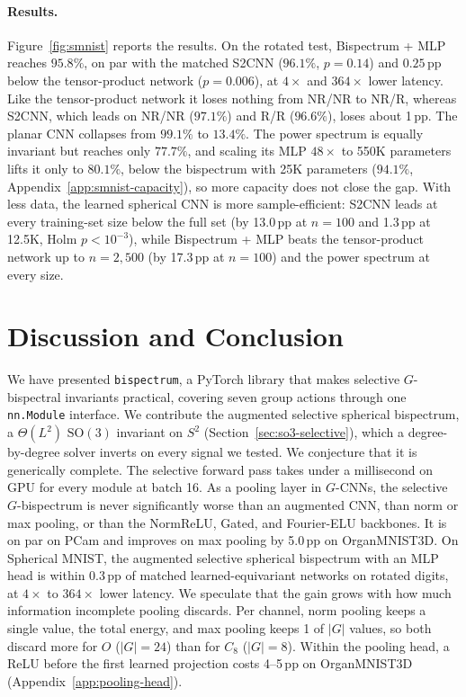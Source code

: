 \documentclass{article}
\theoremstyle{definition}
\theoremstyle{remark}
\newcommand{\SO}{\mathrm{SO}}
\theoremstyle{definition}
\begin{document}
\paragraph{Results.}
Figure~\ref{fig:smnist} reports the results. On the
rotated test, Bispectrum + MLP reaches $95.8\%$, on par with the matched S2CNN
($96.1\%$, $p{=}0.14$) and $0.25$\,pp below the tensor-product network ($p{=}0.006$), at
$4\times$ and $364\times$ lower latency. Like the tensor-product network it loses nothing
from NR/NR to NR/R, whereas S2CNN, which leads on NR/NR ($97.1\%$) and R/R ($96.6\%$), loses
about 1\,pp. The planar CNN collapses from $99.1\%$ to $13.4\%$. The power spectrum is equally
invariant but reaches only $77.7\%$, and scaling its MLP $48\times$ to 550K parameters lifts
it only to $80.1\%$, below the bispectrum with 25K parameters ($94.1\%$,
Appendix~\ref{app:smnist-capacity}), so more capacity does not close the gap. With
less data, the learned spherical CNN is more sample-efficient: S2CNN leads at every
training-set size below the full set (by 13.0\,pp at $n{=}100$ and 1.3\,pp at 12.5K, Holm
$p<10^{-3}$), while Bispectrum + MLP beats the tensor-product network up to $n{=}2{,}500$
(by 17.3\,pp at $n{=}100$) and the power spectrum at every size.


\section{Discussion and Conclusion}
\label{sec:discussion}

We have presented \texttt{bispectrum}, a PyTorch library that makes
selective $G$-bispectral invariants practical, covering seven
group actions through one \texttt{nn.Module} interface.
We contribute the augmented selective spherical bispectrum, a $\Theta(L^2)$ $\SO(3)$ invariant on
$S^2$ (Section~\ref{sec:so3-selective}), which a degree-by-degree solver inverts on every
signal we tested. We conjecture that it is generically complete. The selective forward pass
takes under a millisecond on GPU for every module at batch 16. As a pooling layer in
$G$-CNNs, the selective $G$-bispectrum is never significantly worse than an augmented CNN, than
norm or max pooling, or than the NormReLU, Gated, and Fourier-ELU backbones. It is on par on PCam and improves on max
pooling by 5.0\,pp on OrganMNIST3D. On Spherical MNIST, the augmented selective spherical bispectrum with an
MLP head is within 0.3\,pp of matched learned-equivariant networks on rotated digits, at
$4\times$ to $364\times$ lower latency. We speculate that the gain grows with how much
information incomplete pooling discards. Per channel, norm pooling keeps a single value, the
total energy, and max pooling keeps 1 of $|G|$ values, so both discard more for $O$ ($|G|{=}24$)
than for $C_8$ ($|G|{=}8$). Within the pooling head, a ReLU before the first learned
projection costs 4--5\,pp on OrganMNIST3D (Appendix~\ref{app:pooling-head}).
\end{document}
